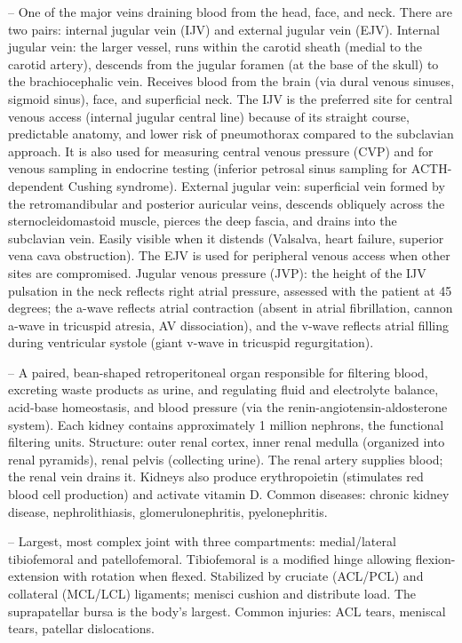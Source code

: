 -- One of the major veins draining blood from the head, face, and neck. There are two pairs: internal jugular vein (IJV) and external jugular vein (EJV). Internal jugular vein: the larger vessel, runs within the carotid sheath (medial to the carotid artery), descends from the jugular foramen (at the base of the skull) to the brachiocephalic vein. Receives blood from the brain (via dural venous sinuses, sigmoid sinus), face, and superficial neck. The IJV is the preferred site for central venous access (internal jugular central line) because of its straight course, predictable anatomy, and lower risk of pneumothorax compared to the subclavian approach. It is also used for measuring central venous pressure (CVP) and for venous sampling in endocrine testing (inferior petrosal sinus sampling for ACTH-dependent Cushing syndrome). External jugular vein: superficial vein formed by the retromandibular and posterior auricular veins, descends obliquely across the sternocleidomastoid muscle, pierces the deep fascia, and drains into the subclavian vein. Easily visible when it distends (Valsalva, heart failure, superior vena cava obstruction). The EJV is used for peripheral venous access when other sites are compromised. Jugular venous pressure (JVP): the height of the IJV pulsation in the neck reflects right atrial pressure, assessed with the patient at 45 degrees; the a-wave reflects atrial contraction (absent in atrial fibrillation, cannon a-wave in tricuspid atresia, AV dissociation), and the v-wave reflects atrial filling during ventricular systole (giant v-wave in tricuspid regurgitation).

-- A paired, bean-shaped retroperitoneal organ responsible for filtering blood, excreting waste products as urine, and regulating fluid and electrolyte balance, acid-base homeostasis, and blood pressure (via the renin-angiotensin-aldosterone system). Each kidney contains approximately 1 million nephrons, the functional filtering units. Structure: outer renal cortex, inner renal medulla (organized into renal pyramids), renal pelvis (collecting urine). The renal artery supplies blood; the renal vein drains it. Kidneys also produce erythropoietin (stimulates red blood cell production) and activate vitamin D. Common diseases: chronic kidney disease, nephrolithiasis, glomerulonephritis, pyelonephritis.

-- Largest, most complex joint with three compartments: medial/lateral tibiofemoral and patellofemoral. Tibiofemoral is a modified hinge allowing flexion-extension with rotation when flexed. Stabilized by cruciate (ACL/PCL) and collateral (MCL/LCL) ligaments; menisci cushion and distribute load. The suprapatellar bursa is the body's largest. Common injuries: ACL tears, meniscal tears, patellar dislocations.

